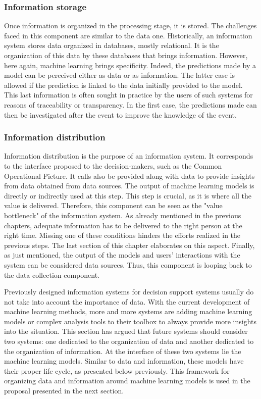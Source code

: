 \subsubsection{Information storage}
Once information is organized in the processing stage, it is stored.
The challenges faced in this component are similar to the data one.
Historically, an information system stores data organized in databases, mostly relational.
It is the organization of this data by these databases that brings information.
However, here again, machine learning brings specificity.
Indeed, the predictions made by a model can be perceived either as data or as information.
The latter case is allowed if the prediction is linked to the data initially provided to the model.
This last information is often sought in practice by the users of such systems for reasons of traceability or transparency.
In the first case, the predictions made can then be investigated after the event to improve the knowledge of the event.

\subsubsection{Information distribution}
\label{sec:information-distribution}
Information distribution is the purpose of an information system.
It corresponds to the interface proposed to the decision-makers, such as the Common Operational Picture.
It calls also be provided along with data to provide insights from data obtained from data sources.
The output of machine learning models is directly or indirectly used at this step.
This step is crucial, as it is where all the value is delivered.
Therefore, this component can be seen as the "value bottleneck" of the information system.
As already mentioned in the previous chapters, adequate information has to be delivered to the right person at the right time.
Missing one of these conditions hinders the efforts realized in the previous steps.
The last section of this chapter elaborates on this aspect.
Finally, as just mentioned, the output of the models and users' interactions with the system can be considered data sources.
Thus, this component is looping back to the data collection component.

Previously designed information systems for decision support systems usually do not take into account the importance of data.
With the current development of machine learning methods, more and more systems are
adding machine learning models or complex analysis tools to their toolbox to always provide more insights into the situation.
This section has argued that future systems should consider two systems: one
dedicated to the organization of data and another dedicated to the organization of information.
At the interface of these two systems lie the machine learning models.
Similar to data and information, these models have their proper life cycle, as presented below previously.
This framework for organizing data and information around machine learning models is used
in the proposal presented in the next section.

